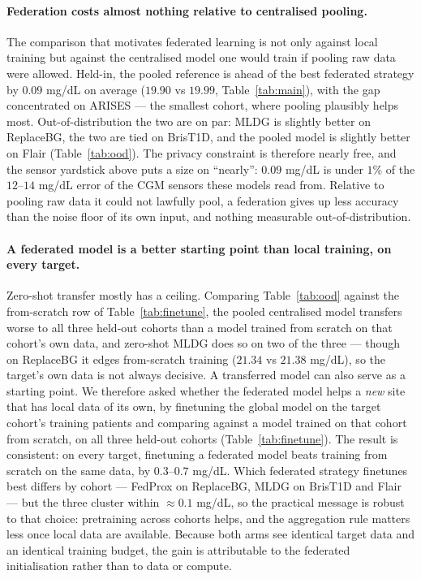 \documentclass[10pt,letterpaper]{article}
\begin{document}
\paragraph{Federation costs almost nothing relative to centralised pooling.}
The comparison that motivates federated learning is not only against local
training but against the centralised model one would train if pooling raw data
were allowed. Held-in, the pooled reference is ahead of the best federated
strategy by $0.09$ mg/dL on average ($19.90$ vs $19.99$,
Table~\ref{tab:main}), with the gap concentrated on ARISES --- the smallest
cohort, where pooling plausibly helps most. Out-of-distribution the two are on
par: MLDG is slightly better on ReplaceBG, the two are tied on BrisT1D, and the
pooled model is slightly better on Flair (Table~\ref{tab:ood}). The privacy
constraint is therefore nearly free, and the sensor yardstick above puts a size
on ``nearly'': $0.09$ mg/dL is under $1\%$ of the $12$--$14$ mg/dL error of the
CGM sensors these models read from. Relative to pooling raw data it could not
lawfully pool, a federation gives up less accuracy than the noise floor of its
own input, and nothing measurable out-of-distribution.

\paragraph{A federated model is a better starting point than local training, on
every target.} Zero-shot transfer mostly has a ceiling. Comparing
Table~\ref{tab:ood} against the from-scratch row of Table~\ref{tab:finetune},
the pooled centralised model transfers worse to all three held-out cohorts than
a model trained from scratch on that cohort's own data, and zero-shot MLDG does
so on two of the three --- though on ReplaceBG it edges from-scratch training
($21.34$ vs $21.38$ mg/dL), so the target's own data is not always decisive. A
transferred model can also serve as a starting point. We therefore asked whether the federated
model helps a \emph{new} site that has local data of its own, by finetuning the
global model on the target cohort's training patients and comparing against a
model trained on that cohort from scratch, on all three held-out cohorts
(Table~\ref{tab:finetune}). The
result is consistent: on every target, finetuning a federated model beats training
from scratch on the same data, by $0.3$--$0.7$ mg/dL. Which federated strategy
finetunes best differs by cohort
--- FedProx on ReplaceBG, MLDG on BrisT1D and
Flair --- but the three cluster within $\approx 0.1$ mg/dL, so the practical
message is robust to that choice: pretraining across cohorts helps, and the
aggregation rule matters less once local data are available. Because both arms see
identical target data and an identical training budget, the gain is attributable
to the federated initialisation rather than to data or compute.
\end{document}
